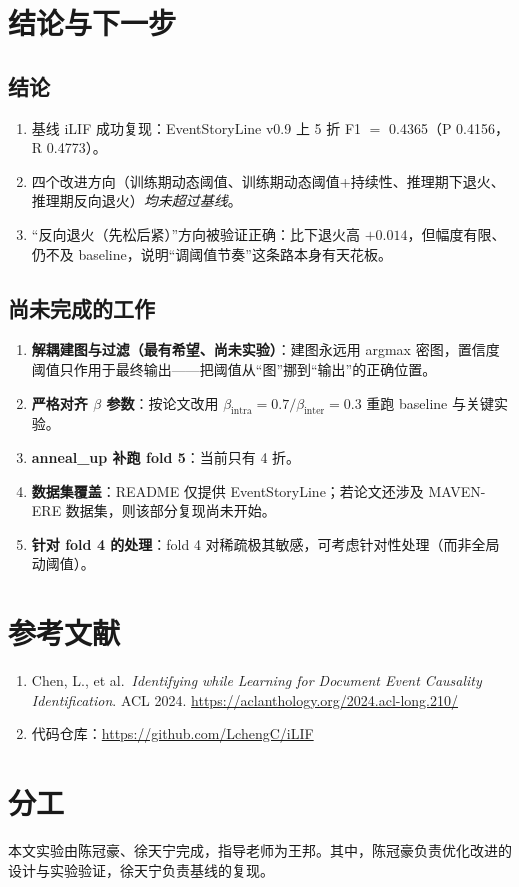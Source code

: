\documentclass[11pt,a4paper]{ctexart}
\begin{document}
\section{结论与下一步}

\subsection{结论}

\begin{enumerate}
\item 基线 iLIF 成功复现：EventStoryLine v0.9 上 5 折 F1 $=$ 0.4365（P 0.4156，R 0.4773）。
\item 四个改进方向（训练期动态阈值、训练期动态阈值+持续性、推理期下退火、推理期反向退火）\emph{均未超过基线}。
\item ``反向退火（先松后紧）''方向被验证正确：比下退火高 $+0.014$，但幅度有限、仍不及 baseline，说明``调阈值节奏''这条路本身有天花板。
\end{enumerate}

\subsection{尚未完成的工作}

\begin{enumerate}
\item \textbf{解耦建图与过滤（最有希望、尚未实验）}：建图永远用 argmax 密图，置信度阈值只作用于最终输出——把阈值从``图''挪到``输出''的正确位置。
\item \textbf{严格对齐 $\beta$ 参数}：按论文改用 $\beta_{\mathrm{intra}}=0.7 / \beta_{\mathrm{inter}}=0.3$ 重跑 baseline 与关键实验。
\item \textbf{anneal\_up 补跑 fold 5}：当前只有 4 折。
\item \textbf{数据集覆盖}：README 仅提供 EventStoryLine；若论文还涉及 MAVEN-ERE 数据集，则该部分复现尚未开始。
\item \textbf{针对 fold 4 的处理}：fold 4 对稀疏极其敏感，可考虑针对性处理（而非全局动阈值）。
\end{enumerate}

\section*{参考文献}

\begin{enumerate}
\item Chen, L., et al.\ \emph{Identifying while Learning for Document Event Causality Identification}. ACL 2024. \url{https://aclanthology.org/2024.acl-long.210/}
\item 代码仓库：\url{https://github.com/LchengC/iLIF}
\end{enumerate}

\section*{分工}

本文实验由陈冠豪、徐天宁完成，指导老师为王邦。其中，陈冠豪负责优化改进的设计与实验验证，徐天宁负责基线的复现。
\end{document}
